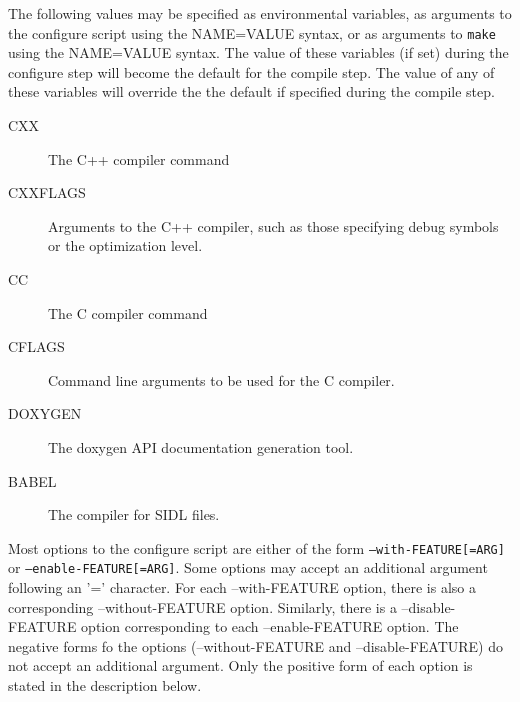 \label{mes_vars_and_defs}
The following values may be specified as environmental variables, as arguments
to the configure script using the NAME=VALUE syntax, or as arguments to \texttt{make}
using the NAME=VALUE syntax.  The value of these variables (if set) during the
configure step will become the default for the compile step.  The value of any
of these variables will override the the default if specified during the compile
step.
\begin{description}
\item[CXX]       The C++ compiler command
\item[CXXFLAGS]  Arguments to the C++ compiler, such as those specifying 
debug symbols or the optimization level.
\item[CC]        The C compiler command
\item[CFLAGS]    Command line arguments to be used for the C compiler.
\item[DOXYGEN]   The doxygen API documentation generation tool.
\item[BABEL]     The compiler for SIDL files.
\end{description}

Most options to the configure script are either of the form \texttt{--with-FEATURE[=ARG]} or
\texttt{--enable-FEATURE[=ARG]}.  Some options may accept an additional argument following 
an '=' character.  For each --with-FEATURE option, there is also a corresponding
--without-FEATURE option.  Similarly, there is a --disable-FEATURE option 
corresponding to each --enable-FEATURE option.  The negative forms fo the options 
(--without-FEATURE and --disable-FEATURE) do not accept an additional argument.  
Only the positive form of each option is stated in the description below.  

